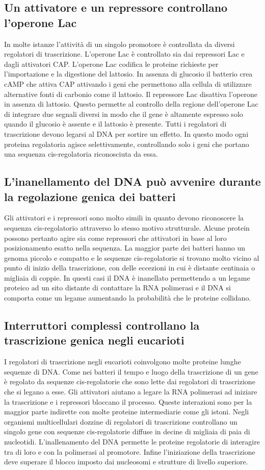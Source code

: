 \subsection{Un attivatore e un repressore controllano l'operone Lac}
In molte istanze l'attivit\`a di un singolo promotore \`e controllata da diversi regolatori di trascrizione. L'operone Lac \`e controllato sia dai repressori Lac e dagli attivatori CAP. 
L'operone Lac codifica le proteine richieste per l'importazione e la digestione del lattosio. In assenza di glucosio il batterio crea cAMP che attiva CAP attivando i geni che permettono
alla cellula di utilizzare alternative fonti di carbonio come il lattosio. Il repressore Lac disattiva l'operone in assenza di lattosio. Questo permette al controllo della regione 
dell'operone Lac di integrare due segnali diversi in modo che il gene \`e altamente espresso solo quando il glucosio \`e assente e il lattosio \`e presente. Tutti i regolatori di 
trascrizione devono legarsi al DNA per sortire un effetto. In questo modo ogni proteina regolatoria agisce selettivamente, controllando solo i geni che portano una sequenza 
cis-regolatoria riconosciuta da essa.
\subsection{L'inanellamento del DNA pu\`o avvenire durante la regolazione genica dei batteri}
Gli attivatori e i repressori sono molto simili in quanto devono riconoscere la sequenza cis-regolatorio attraverso lo stesso motivo strutturale. Alcune protein possono pertanto agire
sia come repressori che attivatori in base al loro posizionamento esatto nella sequenza. La maggior parte dei batteri hanno un genoma piccolo e compatto e le sequenze cis-regolatorie si
trovano molto vicino al punto di inizio della trascrizione, con delle eccezioni in cui \`e distante centinaia o migliaia di coppie. In questi casi il DNA \`e inanellato permettendo a un
legame proteico ad un sito distante di contattare la RNA polimerasi e il DNA si comporta come un legame aumentando la probabilit\`a che le proteine collidano. 
\subsection{Interruttori complessi controllano la trascrizione genica negli eucarioti}
I regolatori di trascrizione negli eucarioti coinvolgono molte proteine lunghe sequenze di DNA. Come nei batteri il tempo e luogo della trascrizione di un gene \`e regolato da sequenze
cis-regolatorie che sono lette dai regolatori di trascrizione che si legano a esse. Gli attivatori aiutano a legare la RNA polimerasi ad iniziare la trascrizione e i repressori bloccano
il processo. Queste interazioni sono per la maggior parte indirette con molte proteine intermediarie come gli istoni. Negli organismi multicellulari dozzine di regolatori di trascrizione
controllano un singolo gene con sequenze cis-regolatorie diffuse in decine di migliaia di paia di nucleotidi. L'inallenamento del DNA permette le proteine regolatorie di interagire tra 
di loro e con la polimerasi al promotore. Infine l'iniziazione della trascrizione deve superare il blocco imposto dai nucleosomi e strutture di livello superiore.
